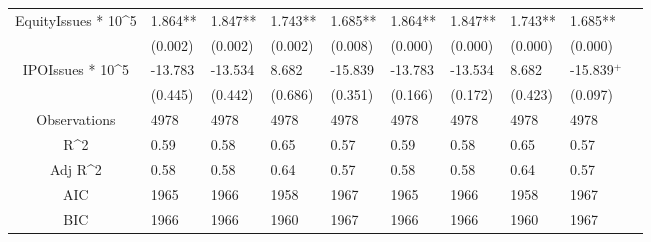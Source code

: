 \documentclass{article}
\begin{document}
\begin{table}[H]
\begin{tabular}{|clllllllll|}
  EquityIssues * 10^5 & 1.864** & 1.847** & 1.743** & 1.685** & 1.864** & 1.847** & 1.743** & 1.685** & \\ 
   & (0.002) & (0.002) & (0.002) & (0.008) & (0.000) & (0.000) & (0.000) & (0.000) & \\ 
  IPOIssues * 10^5 & -13.783 & -13.534 & 8.682 & -15.839 & -13.783 & -13.534 & 8.682 & -15.839$^{+}$ & \\ 
   & (0.445) & (0.442) & (0.686) & (0.351) & (0.166) & (0.172) & (0.423) & (0.097) & \\ 
  \hline 
 Observations & 4978 & 4978 & 4978 & 4978 & 4978 & 4978 & 4978 & 4978 & \\ 
  R^2 & 0.59 & 0.58 & 0.65 & 0.57 & 0.59 & 0.58 & 0.65 & 0.57 & \\ 
  Adj R^2 & 0.58 & 0.58 & 0.64 & 0.57 & 0.58 & 0.58 & 0.64 & 0.57 & \\ 
  AIC & 1965 & 1966 & 1958 & 1967 & 1965 & 1966 & 1958 & 1967 & \\ 
  BIC & 1966 & 1966 & 1960 & 1967 & 1966 & 1966 & 1960 & 1967 & \\ 
   \hline
\end{tabular}
 
\end{table}
\end{document}
